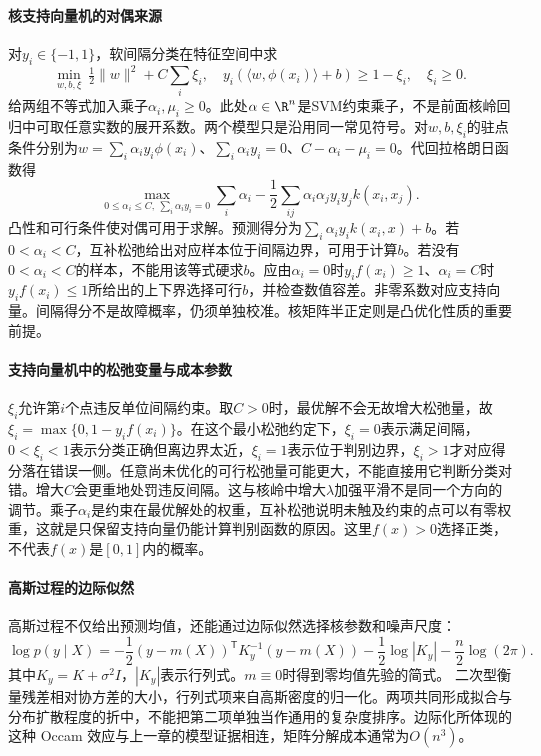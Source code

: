 \paragraph{核支持向量机的对偶来源}
对$y_i\in\{-1,1\}$，软间隔分类在特征空间中求
\begin{equation}
 \min_{w,b,\xi}\ \tfrac12\|w\|^2+C\sum_i\xi_i,
 \quad y_i(\langle w,\phi(x_i)\rangle+b)\geq1-\xi_i,
 \quad\xi_i\geq0.
\end{equation}
给两组不等式加入乘子$\alpha_i,\mu_i\geq0$。此处$\alpha\in\R^n$是SVM约束乘子，不是前面核岭回归中可取任意实数的展开系数。两个模型只是沿用同一常见符号。对$w,b,\xi_i$的驻点条件分别为$w=\sum_i\alpha_iy_i\phi(x_i)$、$\sum_i\alpha_iy_i=0$、$C-\alpha_i-\mu_i=0$。代回拉格朗日函数得
\begin{equation}
 \max_{0\leq\alpha_i\leq C,\ \sum_i\alpha_iy_i=0}
 \sum_i\alpha_i-\frac12\sum_{ij}\alpha_i\alpha_jy_iy_jk(x_i,x_j).
\end{equation}
凸性和可行条件使对偶可用于求解。预测得分为$\sum_i\alpha_iy_ik(x_i,x)+b$。若$0<\alpha_i<C$，互补松弛给出对应样本位于间隔边界，可用于计算$b$。若没有$0<\alpha_i<C$的样本，不能用该等式硬求$b$。应由$\alpha_i=0$时$y_if(x_i)\geq1$、$\alpha_i=C$时$y_if(x_i)\leq1$所给出的上下界选择可行$b$，并检查数值容差。非零系数对应支持向量。间隔得分不是故障概率，仍须单独校准。核矩阵半正定则是凸优化性质的重要前提。

\paragraph{支持向量机中的松弛变量与成本参数}
$\xi_i$允许第$i$个点违反单位间隔约束。取$C>0$时，最优解不会无故增大松弛量，故$\xi_i=\max\{0,1-y_if(x_i)\}$。在这个最小松弛约定下，$\xi_i=0$表示满足间隔，$0<\xi_i<1$表示分类正确但离边界太近，$\xi_i=1$表示位于判别边界，$\xi_i>1$才对应得分落在错误一侧。任意尚未优化的可行松弛量可能更大，不能直接用它判断分类对错。增大$C$会更重地处罚违反间隔。这与核岭中增大$\lambda$加强平滑不是同一个方向的调节。乘子$\alpha_i$是约束在最优解处的权重，互补松弛说明未触及约束的点可以有零权重，这就是只保留支持向量仍能计算判别函数的原因。这里$f(x)>0$选择正类，不代表$f(x)$是$[0,1]$内的概率。

\paragraph{高斯过程的边际似然}
高斯过程不仅给出预测均值，还能通过边际似然选择核参数和噪声尺度：
\begin{equation}
 \log p(y\mid X)=-\frac12(y-m(X))^{\mathsf T}K_y^{-1}(y-m(X))-\frac12\log|K_y|-\frac n2\log(2\pi).\label{eq:kernel-marginal-likelihood}
\end{equation}
其中$K_y=K+\sigma^2I$，$|K_y|$表示行列式。$m\equiv0$时得到零均值先验的简式。
二次型衡量残差相对协方差的大小，行列式项来自高斯密度的归一化。两项共同形成拟合与分布扩散程度的折中，不能把第二项单独当作通用的复杂度排序。边际化所体现的这种 Occam 效应与上一章的模型证据相连，矩阵分解成本通常为$O(n^3)$。

